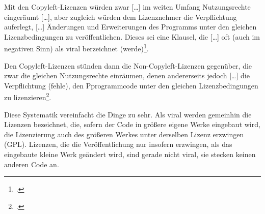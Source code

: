 \documentclass[DIV=calc,BCOR=5mm,11pt,headings=small,oneside,abstract=true, toc=bib]{scrartcl}
\begin{document}
Mit den \glqq{}Copyleft-Lizenzen\grqq{} würden zwar \glqq{}[\ldots] im weiten
Umfang Nutzungsrechte eingeräumt [\ldots]\grqq{}, aber zugleich würden dem
\glqq{}Lizenznehmer\grqq{} die \glqq{}Verpflichtung\grqq{} auferlegt,
\glqq{}[\ldots] Änderungen und Erweiterungen des Programms unter den gleichen
Lizenzbedingungen zu veröffentlichen\grqq{}. Dieses sei eine Klausel, die
\glqq{}[\ldots] oft (auch im negativen Sinn) als viral berzeichnet
(werde)\grqq{}\footcite[vgl.][19f]{DeNicolo2010a}.

Den \glqq{}Copyleft-Lizenzen\grqq{} stünden dann die
\glqq{}Non-Copyleft-Lizenzen\grqq{} gegenüber, die zwar die gleichen
Nutzungsrechte einräumen, denen andererseits jedoch \glqq{}[\ldots] die
Verpflichtung (fehle), den Pprogrammcode unter den gleichen Lizenzbedingungen zu
lizenzieren\grqq{}\footcite[vgl.][20]{DeNicolo2010a}.

Diese Systematik vereinfacht die Dinge zu sehr. Als viral werden gemeinhin
die Lizenzen bezeichnet, die, sofern der Code in größere eigene Werke eingebaut
wird, die Lizenzierung auch des größeren Werkes unter derselben Lizenz erzwingen
(GPL). Lizenzen, die die Veröffentlichung nur insofern erzwingen, als das
eingebaute kleine Werk geändert wird, sind gerade nicht viral, sie stecken
keinen anderen Code an.

\small

\end{document}
